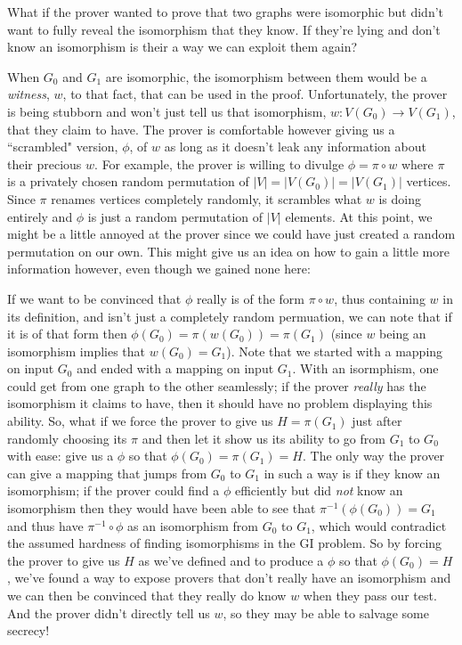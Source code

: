 		What if the prover wanted to prove that two graphs were isomorphic but didn't want to fully reveal the isomorphism that they know.  If they're lying and don't know an isomorphism is their a way we can exploit them again?
		
		When $G_0$ and $G_1$ are isomorphic, the isomorphism between them would be a \textit{witness}, $w$, to that fact, that can be used in the proof.  Unfortunately, the prover is being stubborn and won't just tell us that isomorphism, $w:V(G_0)\rightarrow V(G_1)$, that they claim to have.  The prover is comfortable however giving us a ``scrambled" version, $\phi$, of $w$ as long as it doesn't leak any information about their precious $w$.  For example, the prover is willing to divulge $\phi = \pi \circ w$ where $\pi$ is a privately chosen random permutation of $|V|=|V(G_0)|=|V(G_1)|$ vertices.  Since $\pi$ renames vertices completely randomly, it scrambles what $w$ is doing entirely and $\phi$ is just a random permutation of $|V|$ elements.  At this point, we might be a little annoyed at the prover since we could have just created a random permutation on our own.  This might give us an idea on how to gain a little more information however, even though we gained none here:
		
		If we want to be convinced that $\phi$ really is of the form $\pi \circ w$, thus containing $w$ in its definition, and isn't just a completely random permuation, we can note that if it is of that form then $\phi(G_0)=\pi(w(G_0))=\pi(G_1)$ (since $w$ being an isomorphism implies that $w(G_0)=G_1$).  Note that we started with a mapping on input $G_0$ and ended with a mapping on input $G_1$.  With an isormphism, one could get from one graph to the other seamlessly; if the prover \textit{really} has the isomorphism it claims to have, then it should have no problem displaying this ability.  So, what if we force the prover to give us $H=\pi (G_1)$ just after randomly choosing its $\pi$ and then let it show us its ability to go from $G_1$ to $G_0$ with ease: give us a $\phi$ so that $\phi(G_0)=\pi(G_1)=H$.  The only way the prover can give a mapping that jumps from $G_0$ to $G_1$ in such a way is if they know an isomorphism; if the prover could find a $\phi$ efficiently but did \textit{not} know an isomorphism then they would have been able to see that $\pi^{-1}(\phi(G_0))=G_1$ and thus have $\pi^{-1}\circ\phi$ as an isomorphism from $G_0$ to $G_1$, which would contradict the assumed hardness of finding isomorphisms in the GI problem.  So by forcing the prover to give us $H$ as we've defined and to produce a $\phi$ so that $\phi(G_0)=H$, we've found a way to expose provers that don't really have an isomorphism and we can then be convinced that they really do know $w$ when they pass our test.  And the prover didn't directly tell us $w$, so they may be able to salvage some secrecy!
		
